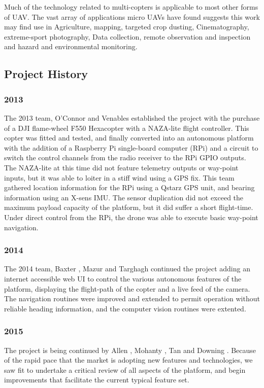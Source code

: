\documentclass[a4paper, 11pt, titlepage]{article}
\begin{document}
    Much of the technology related to multi-copters is applicable to most other forms of UAV.  The vast array of applications micro UAVs have found suggests this work may find use in Agriculture, mapping, targeted crop dusting, Cinematography, extreme-sport photography, Data collection, remote observation and inspection and hazard and environmental monitoring.


  \subsection{Project History}
    \subsubsection{2013}
    The 2013 team, O'Connor \cite{OConnor} and Venables \cite{Venables} established the project with the purchase of a DJI flame-wheel F550 Hexacopter with a NAZA-lite flight controller.  This copter was fitted and tested, and finally converted into an autonomous platform with the addition of a Raspberry Pi single-board computer (RPi) and a circuit to switch the control channels from the radio receiver to the RPi GPIO outputs.
    The NAZA-lite at this time did not feature telemetry outputs or way-point inputs, but it was able to loiter in a stiff wind using a GPS fix.
    This team gathered location information for the RPi using a Qstarz GPS unit, and bearing information using an X-sens IMU.  The sensor duplication did not exceed the maximum payload capacity of the platform, but it did suffer a short flight-time.
    Under direct control from the RPi, the drone was able to execute basic way-point navigation.
    \subsubsection{2014}

    The 2014 team, Baxter \cite{Baxter}, Mazur \cite{Mazur} and Targhagh \cite{Targhagh} continued the project adding an internet accessible web UI to control the various autonomous features of the platform, displaying the flight-path of the copter and a live feed of the camera.
    The navigation routines were improved and extended to permit operation without reliable heading information, and the computer vision routines were extented.

    \subsubsection{2015}
    The project is being continued by Allen \cite{Allen}, Mohanty \cite{Mohanty}, Tan \cite{Tan} and Downing \cite{Downing}.
    Because of the rapid pace that the market is adopting new features and technologies, we saw fit to undertake a critical review of all aspects of the platform, and begin improvements that facilitate the current typical feature set.
\end{document}
